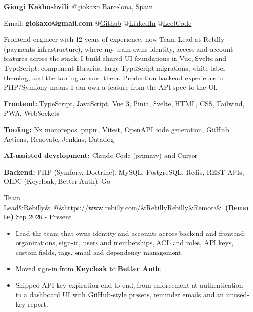 \documentclass[10pt]{article}
\makeatletter
\newcommand{\weblink}[2]{\href{#1}{\textcolor{linkblue}{\underline{#2}}}}
\newcommand{\resumesection}[1]{\vspace{9pt}{\small\bfseries\textls{\MakeUppercase{#1}}}\par\vspace{3pt}}
\newcommand{\role}[5]{%
  \vspace{5pt}\par\noindent
  {\normalsize #1\ifx&#2&\else\ @\ifx&#3&#2\else\weblink{#3}{#2}\fi\fi\ifx&#4&\else\ \textbf{(#4)}\fi}%
  \hfill{\footnotesize #5}\par\nopagebreak\vspace{1pt}}
\makeatother
\begin{document}
\small

{\Large\bfseries Giorgi Kakhoshvili}\ {\large @giokaxo} \hfill Barcelona, Spain\par
\vspace{3pt}
Email: \textbf{giokaxo@gmail.com} \hfill {\footnotesize
@\weblink{https://github.com/giokaxo}{Github}
@\weblink{https://www.linkedin.com/in/giorgi-kakhoshvili/}{LinkedIn}
@\weblink{https://leetcode.com/u/giokaxo/}{LeetCode}}\par

\resumesection{Summary}
Frontend engineer with 12 years of experience, now Team Lead at Rebilly (payments infrastructure), where my team owns identity, access and account features across the stack. I build shared UI foundations in Vue, Svelte and TypeScript: component libraries, large TypeScript migrations, white-label theming, and the tooling around them. Production backend experience in PHP/Symfony means I can own a feature from the API spec to the UI.\par

\resumesection{Skills}
\textbf{Frontend:} TypeScript, JavaScript, Vue 3, Pinia, Svelte, HTML, CSS, Tailwind, PWA, WebSockets\par
\textbf{Tooling:} Nx monorepos, pnpm, Vitest, OpenAPI code generation, GitHub Actions, Renovate, Jenkins, Datadog\par
\textbf{AI-assisted development:} Claude Code (primary) and Cursor\par
\textbf{Backend:} PHP (Symfony, Doctrine), MySQL, PostgreSQL, Redis, REST APIs, OIDC (Keycloak, Better Auth), Go\par

\resumesection{Experience}

\role{Team Lead}{Rebilly}{https://www.rebilly.com/}{Remote}{Sep 2026 - Present}
\begin{itemize}
  \item Lead the team that owns identity and accounts across backend and frontend: organizations, sign-in, users and memberships, ACL and roles, API keys, custom fields, tags, email and dependency management.
  \item Moved sign-in from \textbf{Keycloak} to \textbf{Better Auth}.
  \item Shipped API key expiration end to end, from enforcement at authentication to a dashboard UI with GitHub-style presets, reminder emails and an unused-key report.
\end{itemize}
\end{document}
